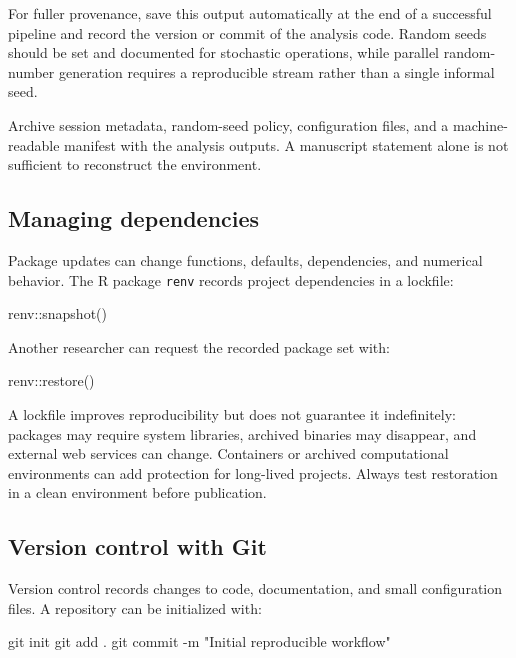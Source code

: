 For fuller provenance, save this output automatically at the end of a successful pipeline and record the version or commit of the analysis code. Random seeds should be set and documented for stochastic operations, while parallel random-number generation requires a reproducible stream rather than a single informal seed.

\begin{sdmpracticebox}
Archive session metadata, random-seed policy, configuration files, and a machine-readable manifest with the analysis outputs. A manuscript statement alone is not sufficient to reconstruct the environment.
\end{sdmpracticebox}

\subsection{Managing dependencies}

Package updates can change functions, defaults, dependencies, and numerical behavior. The R package \texttt{renv} records project dependencies in a lockfile:

\begin{rcode}
renv::snapshot()
\end{rcode}

Another researcher can request the recorded package set with:

\begin{rcode}
renv::restore()
\end{rcode}

A lockfile improves reproducibility but does not guarantee it indefinitely: packages may require system libraries, archived binaries may disappear, and external web services can change. Containers or archived computational environments can add protection for long-lived projects. Always test restoration in a clean environment before publication.

\subsection{Version control with Git}

Version control records changes to code, documentation, and small configuration files. A repository can be initialized with:

\begin{shellcode}
git init
git add .
git commit -m "Initial reproducible workflow"
\end{shellcode}

